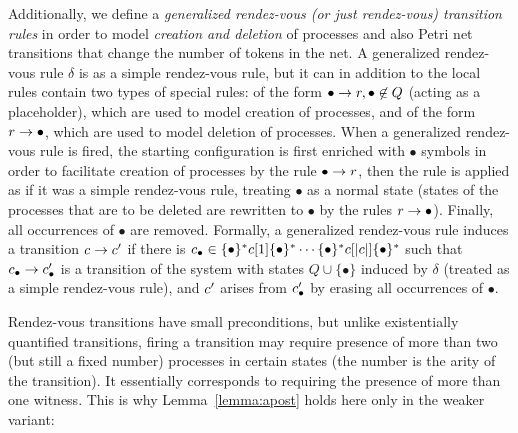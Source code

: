 %

\newcommand\placeholder\bullet

Additionally, we define a \emph{generalized rendez-vous (or just
  rendez-vous) transition rules} in order to model \emph{creation and
  deletion} of processes and also Petri net transitions that change
the number of tokens in the net. 
%
A generalized rendez-vous rule $\delta$ is as a simple rendez-vous
rule, but it can in addition to the local rules contain two types of
special rules: of the form $\placeholder\trans
r,\placeholder\not\in\locs$ (acting as a placeholder), which are used
to model creation of processes, and of the form $r\trans
\placeholder$, which are used to model deletion of processes.
%
When a generalized rendez-vous rule is fired, the starting
configuration is first enriched with $\placeholder$ symbols in order
to facilitate creation of processes by the rule $\placeholder\trans
r$, then the rule is applied as if it was a simple rendez-vous rule,
treating $\placeholder$ as a normal state (states of the processes
that are to be deleted are rewritten to $\placeholder$ by the rules
$r\trans\placeholder$).  Finally, all occurrences of $\placeholder$
are removed.
%
Formally, a generalized rendez-vous rule induces a transition
$c\rightarrow c'$ if there is
$\conf_\placeholder\in\{\placeholder\}^*\conf[1]\{\placeholder\}^*\cdots\{\placeholder\}^*\conf[|\conf|]\{\placeholder\}^*$
such that $\conf_\placeholder\trans\conf_\placeholder'$ is a
transition of the system with states $Q\cup\{\placeholder\}$ induced
by $\delta$ (treated as a simple rendez-vous rule), and $c'$
arises from $\conf_\placeholder'$ by erasing all occurrences of
$\placeholder$.

Rendez-vous transitions have small preconditions, but unlike
existentially quantified transitions, firing a transition may require
presence of more than two (but still a fixed number) processes in
certain states (the number is the arity of the transition).
%
It essentially corresponds to requiring the presence of more than one
witness.
%
This is why Lemma~\ref{lemma:apost} holds here only in the weaker variant:

